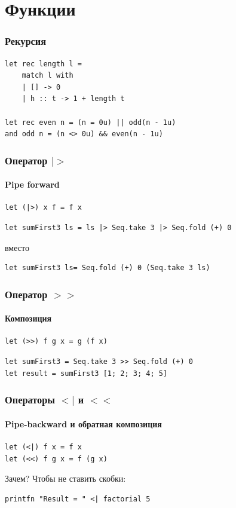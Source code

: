 \documentclass[xetex,mathserif,serif]{beamer}
\begin{document}
	\section{Функции}

	\begin{frame}[fragile]
		\frametitle{Рекурсия}
		\begin{verbatim}
let rec length l =
    match l with
    | [] -> 0
    | h :: t -> 1 + length t

let rec even n = (n = 0u) || odd(n - 1u)
and odd n = (n <> 0u) && even(n - 1u)
		\end{verbatim}
\end{frame}

	\begin{frame}[fragile]
		\frametitle{Оператор $|>$}
		\framesubtitle{Pipe forward}
		\begin{verbatim}
let (|>) x f = f x
		\end{verbatim}

		\begin{verbatim}
let sumFirst3 ls = ls |> Seq.take 3 |> Seq.fold (+) 0
		\end{verbatim}
		вместо
		\begin{verbatim}
let sumFirst3 ls= Seq.fold (+) 0 (Seq.take 3 ls)
		\end{verbatim}
	\end{frame}

	\begin{frame}[fragile]
		\frametitle{Оператор $>>$}
		\framesubtitle{Композиция}
		\begin{verbatim}
let (>>) f g x = g (f x)
		\end{verbatim}
		\begin{verbatim}
let sumFirst3 = Seq.take 3 >> Seq.fold (+) 0
let result = sumFirst3 [1; 2; 3; 4; 5]
		\end{verbatim}
	\end{frame}

	\begin{frame}[fragile]
		\frametitle{Операторы $<|$ и $<<$}
		\framesubtitle{Pipe-backward и обратная композиция}
		\begin{verbatim}
let (<|) f x = f x
let (<<) f g x = f (g x)
		\end{verbatim}
		Зачем? Чтобы не ставить скобки:
		\begin{verbatim}
printfn "Result = " <| factorial 5
		\end{verbatim}
	\end{frame}
\end{document}
